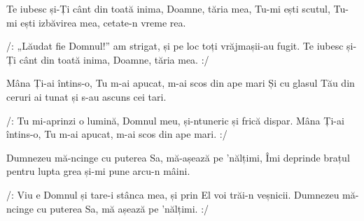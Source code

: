 \beginverse
Te iubesc și-Ți cânt din toată inima, Doamne, tăria mea,
Tu-mi ești scutul, Tu-mi ești izbăvirea mea, cetate-n vreme rea.
\endverse

\beginchorus
/: „Lăudat fie Domnul!” am strigat, și pe loc toți vrăjmașii-au fugit.
Te iubesc și-Ți cânt din toată inima, Doamne, tăria mea. :/
\endchorus

\beginverse
Mâna Ți-ai întins-o, Tu m-ai apucat, m-ai scos din ape mari
Și cu glasul Tău din ceruri ai tunat și s-au ascuns cei tari.
\endverse

\beginchorus
/: Tu mi-aprinzi o lumină, Domnul meu, și-ntuneric și frică dispar.
Mâna Ți-ai întins-o, Tu m-ai apucat, m-ai scos din ape mari. :/
\endchorus

\beginverse
Dumnezeu mă-ncinge cu puterea Sa, mă-așează pe ’nălțimi,
Îmi deprinde brațul pentru lupta grea și-mi pune arcu-n mâini.
\endverse

\beginchorus
/: Viu e Domnul și tare-i stânca mea, și prin El voi trăi-n veșnicii.
Dumnezeu mă-ncinge cu puterea Sa, mă așează pe ’nălțimi. :/
\endchorus
\endsong